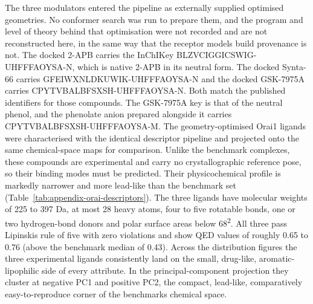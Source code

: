 The three modulators entered the pipeline as externally supplied optimised geometries. No conformer search was run to prepare them, and the program and level of theory behind that optimisation were not recorded and are not reconstructed here, in the same way that the receptor model\textquotesingle s build provenance is not. The docked 2-APB carries the InChIKey BLZVCIGGICSWIG-UHFFFAOYSA-N, which is native 2-APB in its neutral form. The docked Synta-66 carries GFEIWXNLDKUWIK-UHFFFAOYSA-N and the docked GSK-7975A carries CPYTVBALBFSXSH-UHFFFAOYSA-N. Both match the published identifiers for those compounds. The GSK-7975A key is that of the neutral phenol, and the phenolate anion prepared alongside it carries CPYTVBALBFSXSH-UHFFFAOYSA-M. The geometry-optimised Orai1 ligands were characterised with the identical descriptor pipeline and projected onto the same chemical-space maps for comparison. Unlike the benchmark complexes, these compounds are experimental and carry no crystallographic reference pose, so their binding modes must be predicted. Their physicochemical profile is markedly narrower and more lead-like than the benchmark set (Table~\ref{tab:appendix-orai-descriptors}). The three ligands have molecular weights of 225 to 397 Da, at most 28 heavy atoms, four to five rotatable bonds, one or two hydrogen-bond donors and polar surface areas below 68\angstrom{}\textsuperscript{2}. All three pass Lipinski\textquotesingle{}s rule of five with zero violations and show QED values of roughly 0.65 to 0.76 (above the benchmark median of 0.43). Across the distribution figures the three experimental ligands consistently land on the small, drug-like, aromatic-lipophilic side of every attribute. In the principal-component projection they cluster at negative PC1 and positive PC2, the compact, lead-like, comparatively easy-to-reproduce corner of the benchmark\textquotesingle{}s chemical space.

